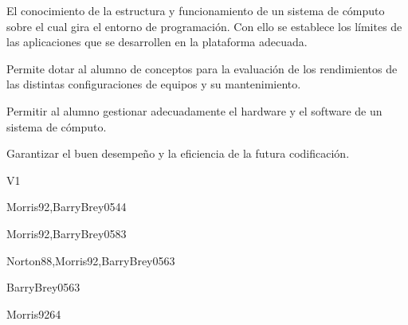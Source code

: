 \begin{syllabus}


\begin{justification}
El conocimiento de la estructura y funcionamiento de un sistema de cómputo sobre el cual gira el entorno de programación. Con ello se establece los límites de las aplicaciones que se desarrollen en la plataforma adecuada.

Permite dotar al alumno de conceptos para la evaluación de los rendimientos de las distintas configuraciones de equipos y su mantenimiento.
\end{justification}

\begin{goals}
\item Permitir al alumno gestionar adecuadamente el hardware y el software de un sistema de cómputo.
\item Garantizar el buen desempeño y la eficiencia de la futura codificación.
\end{goals}

\begin{outcomes}{V1}
\end{outcomes}

\begin{unit}{\ARDigitalLogicAndDataRepresentationDef}{}{Morris92,BarryBrey05}{4}{4}
   \ARDigitalLogicAndDataRepresentationAllTopics
   \ARDigitalLogicAndDataRepresentationAllObjectives
\end{unit}

\begin{unit}{\ARComputerArchitectureOrganizationDef}{}{Morris92,BarryBrey05}{8}{3}
   \ARComputerArchitectureOrganizationAllTopics
    \ARComputerArchitectureOrganizationAllObjectives
\end{unit}

\begin{unit}{\ARMemoryArchitectureDef}{}{Norton88,Morris92,BarryBrey05}{6}{3}
    \ARMemoryArchitectureAllTopics
    \ARMemoryArchitectureAllObjectives
\end{unit}

\begin{unit}{\ARInterfacingAndIOStrategiesDef}{}{BarryBrey05}{6}{3}
    \ARInterfacingAndIOStrategiesAllTopics
    \ARInterfacingAndIOStrategiesAllObjectives
\end{unit}

\begin{unit}{\ARFunctionalOrganizationDef}{}{Morris92}{6}{4}
    \ARFunctionalOrganizationAllTopics
    \ARFunctionalOrganizationAllObjectives
\end{unit}


\end{syllabus}
